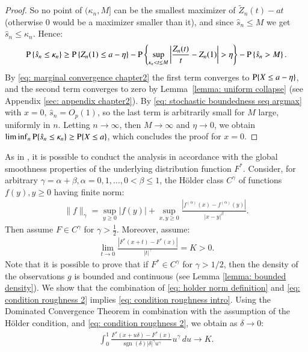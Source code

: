 \begin{proof}
So no point of $(\kappa_n, M]$ can be the smallest maximizer of $\tilde{Z}_n(t)-at$ (otherwise $0$ would be a maximizer smaller than it), and since $\hat{s}_n \leq M$ we get $\hat{s}_n \leq \kappa_n$. Hence:
\begin{align*}
\mathrm{P}\left\{\hat{s}_n \leq \kappa_n\right\} \geq \mathrm{P}\left\{Z_n(1) \leq a-\eta\right\} - \mathrm{P}\left\{\sup_{\kappa_n < t \leq M}\left|\frac{Z_n(t)}{t}-Z_n(1)\right| > \eta\right\} - \mathrm{P}\left\{\hat{s}_n > M\right\}.
\end{align*}
By \eqref{eq: marginal convergence chapter2} the first term converges to $\mathrm{P}\{X \leq a-\eta\}$, and the second term converges to zero by Lemma~\ref{lemma: uniform collapse} (see Appendix \ref{sec: appendix chapter2}). By \eqref{eq: stochastic boundedness seq argmax} with $x=0$, $\hat{s}_n = O_p(1)$, so the last term is arbitrarily small for $M$ large, uniformly in $n$. Letting $n \rightarrow \infty$, then $M \rightarrow \infty$ and $\eta \rightarrow 0$, we obtain $\liminf_{n} \mathrm{P}\{\hat{s}_n \leq \kappa_n\} \geq \mathrm{P}\{X \leq a\}$, which concludes the proof for $x=0$.
\end{proof}

\begin{example}\label{example: holder + local behavior}
As in \cite{10}, it is possible to conduct the analysis in accordance with the global smoothness properties of the underlying distribution function $F^*$. Consider, for arbitrary $\gamma=\alpha+\beta, \alpha=0,1, \ldots, 0<\beta \leq 1$, the Hölder class $C^{\gamma}$ of functions $f(y), y \geq 0$ having finite norm:
\begin{align}\label{eq: holder norm definition}
\|f\|_\gamma=\sup _{y \geq 0}|f(y)|+\sup _{x, y \geq 0} \frac{\left|f^{(\alpha)}(x)-f^{(\alpha)}(y)\right|}{|x-y|^\beta}.
\end{align}
Then assume $F \in C^{\gamma}$ for $\gamma > \frac{1}{2}$. Moreover, assume:
\begin{align}\label{eq: condition roughness 2}
    \lim_{t \rightarrow 0} \frac{|F^*(x+t)-F^*(x)|}{|t|^{\gamma}} = K > 0.
\end{align}
Note that it is possible to prove that if $F^* \in C^{\gamma}$ for $\gamma > 1/2$, then the density of the observations $g$ is bounded and continuous (see Lemma \ref{lemma: bounded density}). We show that the combination of \eqref{eq: holder norm definition} and \eqref{eq: condition roughness 2} implies \eqref{eq: condition roughness intro}.
Using the Dominated Convergence Theorem in combination with the assumption of the Hölder condition, and \eqref{eq: condition roughness 2}, we obtain as $\delta \rightarrow 0$:
\begin{align}\label{eq: reasoning asympt holder 2}
 \int_{0}^{1} \frac{F^*(x + u \delta) - F^*(x)}{ \operatorname{sgn}(\delta) |\delta|^{\gamma} u^{\gamma}} u^{\gamma} \, du \rightarrow K. 
\end{align}
\end{example}

